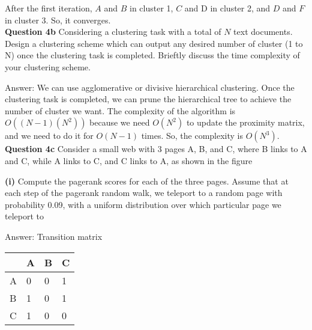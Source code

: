 \documentclass[11pt,a4paper]{report}
\begin{document}
\begin{multicols*}{2}
\noindent After the first iteration, $A$ and $B$ in cluster 1, $C$ and D in cluster 2, and $D$ and $F$ in cluster 3. So, it converges.\\

\noindent \textbf{Question 4b} Considering a clustering task with a total of $N$ text documents. Design a clustering scheme which can output any desired number of cluster (1 to N) once the clustering task is completed. Brieftly discuss the time complexity of your clustering scheme. 

\noindent Answer: We can use agglomerative or divisive hierarchical clustering. Once the clustering task is completed, we can prune the hierarchical tree to achieve the number of cluster we want. The complexity of the algorithm is $O((N-1)(N^2))$ because we need $O(N^2)$ to update the proximity matrix, and we need to do it for $O(N-1)$ times. So, the complexity is $O(N^3)$.\\

\noindent \textbf{Question 4c} Consider a small web with 3 pages A, B, and C, where B links to A and C, while A links to C, and C links to A, as shown in the figure

\begin{center}
\end{center}

\noindent \textbf{(i)} Compute the pagerank scores for each of the three pages. Assume that at each step of the pagerank random walk, we teleport to a random page with probability 0.09, with a uniform distribution over which particular page we teleport to

\noindent Answer: Transition matrix
\begin{center}
\begin{tabular}{ |l|l|l|l| } 
    \hline
      & A  & B  & C \\
    \hline 
    A & 0  & 0  & 1  \\
    B & 1  & 0  & 1  \\
    C & 1  & 0  & 0  \\
    \hline
\end{tabular}
\end{center}


\end{multicols*}
\end{document}
